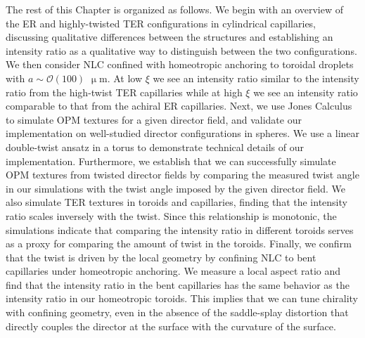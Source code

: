 The rest of this Chapter is organized as follows.
We begin with an overview of the ER and highly-twisted TER configurations in cylindrical capillaries, discussing qualitative differences between the structures and establishing an intensity ratio as a qualitative way to distinguish between the two configurations.
We then consider NLC confined with homeotropic anchoring to toroidal droplets with $a \sim \mathcal{O}(100)$ $\upmu$m.
At low $\xi$ we see an intensity ratio similar to the intensity ratio from the high-twist TER capillaries while at high $\xi$ we see an intensity ratio comparable to that from the achiral ER capillaries.
Next, we use Jones Calculus to simulate OPM textures for a given director field, and validate our implementation on well-studied director configurations in spheres.
We use a linear double-twist ansatz in a torus to demonstrate technical details of our implementation.
Furthermore, we establish that we can successfully simulate OPM textures from twisted director fields by comparing the measured twist angle in our simulations with the twist angle imposed by the given director field.
We also simulate TER textures in toroids and capillaries, finding that the intensity ratio scales inversely with the twist.
Since this relationship is monotonic, the simulations indicate that comparing the intensity ratio in different toroids serves as a proxy for comparing the amount of twist in the toroids.
Finally, we confirm that the twist is driven by the local geometry by confining NLC to bent capillaries under homeotropic anchoring.
We measure a local aspect ratio and find that the intensity ratio in the bent capillaries has the same behavior as the intensity ratio in our homeotropic toroids.
This implies that we can tune chirality with confining geometry, even in the absence of the saddle-splay distortion that directly couples the director at the surface with the curvature of the surface.




